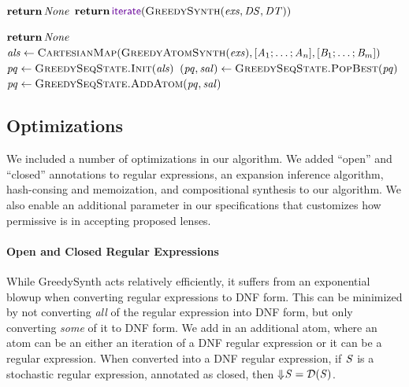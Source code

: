 \documentclass[acmsmall,screen,anonymous]{acmart}
\begin{document}
\begin{algorithm}
  \caption{\GreedySeqSynth}
  \label{alg:greedyseqsynth}
  \begin{algorithmic}[1]
    \State $\ReturnVal{\None}$
    \Else
    \State $\ReturnVal{\IterateLensOf{\GreedySynth(\Examples,\DNFRegex,\DNFRegexAlt)}}$
    \EndIf
    \EndFunction

    \State $\ReturnVal{\None}$
    \EndIf
    \State $\ALS \gets
    \Call{\CartesianMap}{\AtomSynth(\Examples),\ListOf{\Atom_1;\ldots;\Atom_n},\ListOf{\AtomAlt_1;\ldots;\AtomAlt_m}}$
    \State $\GreedyState \gets \Call{GreedySeqState.Init}{\ALS}$
    \State $(\GreedyState,\SAtomLens) \gets
    \Call{GreedySeqState.PopBest}{\GreedyState}$
    \State $\GreedyState \gets \Call{GreedySeqState.AddAtom}{\GreedyState,\SAtomLens}$
    \EndIf
    \EndWhile
    \State {}
    \EndFunction
  \end{algorithmic}
\end{algorithm}

\subsection{Optimizations}

We included a number of optimizations in our algorithm. We added ``open'' and
``closed'' annotations to regular expressions, an expansion inference algorithm,
hash-consing and memoization, and compositional synthesis to our algorithm. We
also enable an additional parameter in our specifications that customizes how
permissive \RXSearch{} is in accepting proposed lenses.

\paragraph*{Open and Closed Regular Expressions} While GreedySynth acts
relatively efficiently, it suffers from an exponential blowup when converting
regular expressions to DNF form. This can be minimized by not converting
\emph{all} of the regular expression into DNF form, but only converting
\emph{some} of it to DNF form. We add in an additional atom, where an atom can
be an either an iteration of a DNF regular expression or it can be a regular
expression. When converted into a DNF regular expression, if $\mathit{S}$ is a
stochastic regular expression, annotated as closed, then $\Downarrow\mkern-4mu \mathit{S}
= \mathcal{D}(\mathit{S})$.
\end{document}

